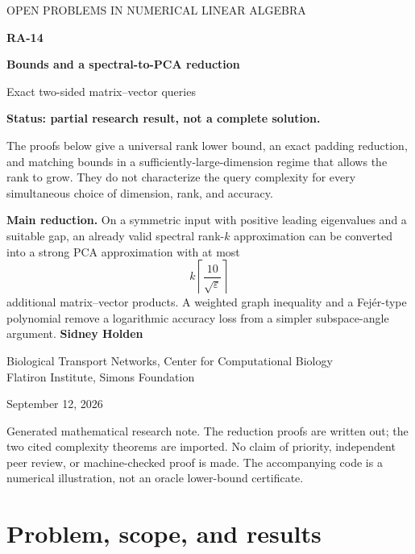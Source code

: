 \documentclass[11pt]{article}
\numberwithin{equation}{section}
\theoremstyle{definition}
\newcommand{\eps}{\varepsilon}
\begin{document}
\begin{titlepage}
\vspace*{0.45in}
{\large\sffamily\color{accent} OPEN PROBLEMS IN NUMERICAL LINEAR ALGEBRA}\par
\vspace{0.3in}
{\Huge\bfseries\color{ink} RA-14}\par
\vspace{0.12in}
{\LARGE\bfseries Bounds and a spectral-to-PCA reduction}\par
\vspace{0.2in}
{\large Exact two-sided matrix--vector queries}\par
\vspace{0.38in}
\begingroup
\setlength{\fboxsep}{12pt}
\noindent\colorbox{ink!6}{\parbox{\dimexpr\textwidth-24pt\relax}{
\textbf{Status: partial research result, not a complete solution.}\par
The proofs below give a universal rank lower bound, an exact padding reduction,
and matching bounds in a sufficiently-large-dimension regime that allows the
rank to grow. They do not characterize the query complexity for every
simultaneous choice of dimension, rank, and accuracy.
}}
\endgroup
\vspace{0.3in}
\textbf{Main reduction.} On a symmetric input with positive leading eigenvalues
and a suitable gap, an already valid spectral rank-$k$ approximation can be
converted into a strong PCA approximation with at most
\[
 k\left\lceil\frac{10}{\sqrt\eps}\right\rceil
\]
additional matrix--vector products. A weighted graph inequality and a
Fej\'er-type polynomial remove a logarithmic accuracy loss from a simpler
subspace-angle argument.
\vfill
\textbf{Sidney Holden}\par
{\small Biological Transport Networks, Center for Computational Biology\\
Flatiron Institute, Simons Foundation}\par
September 12, 2026\par
\smallskip
\small Generated mathematical research note. The reduction proofs are written
out; the two cited complexity theorems are imported. No claim of priority,
independent peer review, or machine-checked proof is made. The accompanying
code is a numerical illustration, not an oracle lower-bound certificate.
\end{titlepage}

\tableofcontents
\newpage

\section{Problem, scope, and results}
\label{sec:scope}
\end{document}
